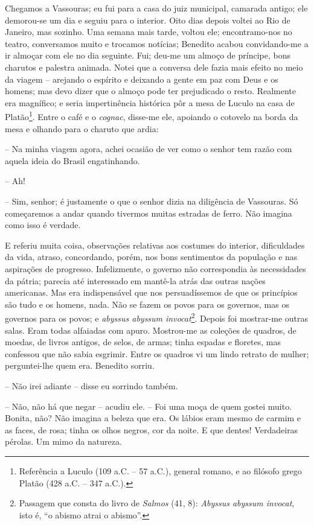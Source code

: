 Chegamos a Vassouras; eu fui para a casa do juiz municipal, camarada
antigo; ele demorou-se um dia e seguiu para o interior. Oito dias depois
voltei ao Rio de Janeiro, mas sozinho. Uma semana mais tarde, voltou
ele; encontramo-nos no teatro, conversamos muito e trocamos notícias;
Benedito acabou convidando-me a ir almoçar com ele no dia seguinte. Fui;
deu-me um almoço de príncipe, bons charutos e palestra animada. Notei
que a conversa dele fazia mais efeito no meio da viagem -- arejando o
espírito e deixando a gente em paz com Deus e os homens; mas devo dizer
que o almoço pode ter prejudicado o resto. Realmente era magnífico; e
seria impertinência histórica pôr a mesa de Luculo na casa de
Platão\footnote{Referência a Luculo (109 a.C. -- 57 a.C.), general
  romano, e ao filósofo grego Platão (428 a.C. -- 347 a.C.).}. Entre o
café e o \emph{cognac}, disse-me ele, apoiando o cotovelo na borda da
mesa e olhando para o charuto que ardia:

-- Na minha viagem agora, achei ocasião de ver como o senhor tem razão
com aquela ideia do Brasil engatinhando.

-- Ah!

-- Sim, senhor; é justamente o que o senhor dizia na diligência de
Vassouras. Só começaremos a andar quando tivermos muitas estradas de
ferro. Não imagina como isso é verdade.

E referiu muita coisa, observações relativas aos costumes do interior,
dificuldades da vida, atraso, concordando, porém, nos bons sentimentos
da população e nas aspirações de progresso. Infelizmente, o governo não
correspondia às necessidades da pátria; parecia até interessado em
mantê-la atrás das outras nações americanas. Mas era indispensável que
nos persuadíssemos de que os princípios são tudo e os homens, nada. Não
se fazem os povos para os governos, mas os governos para os povos; e
\emph{abyssus abyssum invocat}\footnote{Passagem que consta do livro de
  \emph{Salmos} (41, 8): \emph{Abyssus abyssum invocat}, isto é, ``o
  abismo atrai o abismo''.}. Depois foi mostrar-me outras salas. Eram
todas alfaiadas com apuro. Mostrou-me as coleções de quadros, de moedas,
de livros antigos, de selos, de armas; tinha espadas e floretes, mas
confessou que não sabia esgrimir. Entre os quadros vi um lindo retrato
de mulher; perguntei-lhe quem era. Benedito sorriu.

-- Não irei adiante -- disse eu sorrindo também.

-- Não, não há que negar -- acudiu ele. -- Foi uma moça de quem gostei
muito. Bonita, não? Não imagina a beleza que era. Os lábios eram mesmo
de carmim e as faces, de rosa; tinha os olhos negros, cor da noite. E
que dentes! Verdadeiras pérolas. Um mimo da natureza.


